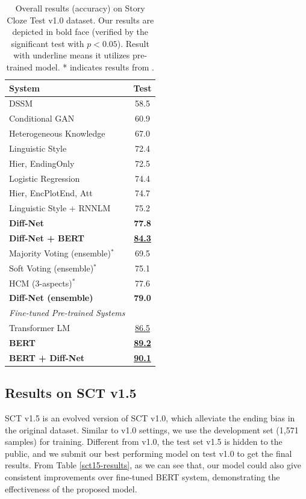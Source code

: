 \documentclass[letterpaper]{article} %
\begin{document}
\begin{table}[tp]
\small
\begin{center}
\begin{tabular}{lc}
\toprule
{\bf System} & {\bf Test } \\
\midrule
	DSSM \cite{mostafazadeh-etal-2016} 						& 58.5 \\
	Conditional GAN \cite{bingning-etal-2017} 					& 60.9 \\
	Heterogeneous Knowledge \cite{lin-etal-2017} 				& 67.0 \\
	Linguistic Style \cite{schwartz-etal-2017} 					& 72.4 \\ 
	Hier, EndingOnly \cite{cai-etal-2017} 						& 72.5 \\
	Logistic Regression \cite{chaturvedi-etal-2017} 				& 74.4 \\
	Hier, EncPlotEnd, Att \cite{cai-etal-2017}					& 74.7 \\
	Linguistic Style + RNNLM \cite{schwartz-etal-2017} 			& 75.2 \\
	\bf Diff-Net											& {\bf 77.8} \\
	\bf Diff-Net + BERT										& {\bf \underline{84.3}} \\	
	\midrule
	Majority Voting (ensemble)$^*$ 							& 69.5 \\
	Soft Voting (ensemble)$^*$								& 75.1 \\
	HCM (3-aspects)$^*$									& 77.6 \\	
	\bf Diff-Net (ensemble) 									& {\bf 79.0} \\
	\midrule \midrule
	\em{Fine-tuned Pre-trained Systems}\\
	Transformer LM \cite{openai-gpt}							& \underline{86.5} \\
	\bf BERT												& {\bf \underline{89.2}} \\ 
	\bf BERT + Diff-Net										& {\bf \underline{90.1}} \\
\bottomrule
\end{tabular}
\end{center}
\caption{\label{overall-results} Overall results (accuracy) on Story Cloze Test v1.0 dataset. Our results are depicted in bold face (verified by the significant test with $p<0.05$). Result with underline means it utilizes pre-trained model. * indicates results from \citeauthor{chaturvedi-etal-2017} .   }
\end{table} 

 
\subsection{Results on SCT v1.5}
SCT v1.5 \cite{sharma-etal-2018-tackling} is an evolved version of SCT v1.0, which alleviate the ending bias in the original dataset.
Similar to v1.0 settings, we use the development set (1,571 samples) for training.
Different from v1.0, the test set v1.5 is hidden to the public, and we submit our best performing model on test v1.0 to get the final results.
From Table \ref{sct15-results}, as we can see that, our model could also give consistent improvements over fine-tuned BERT system, demonstrating the effectiveness of the proposed model.
\end{document}
